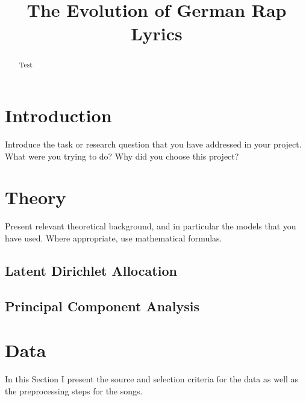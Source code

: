\documentclass[conference]{IEEEtran}
\begin{document}
\title{The Evolution of German Rap Lyrics}


\author{
}

\maketitle

\begin{abstract}
Test
\end{abstract}

\section{Introduction}
Introduce the task or research question that you have addressed in
your project. What were you trying to do? Why did you choose this project?

\section{Theory}
Present relevant theoretical background, and in particular the models that
you have used. Where appropriate, use mathematical formulas.
\subsection{Latent Dirichlet Allocation}
\subsection{Principal Component Analysis}

\section{Data}
In this Section I present the source and selection criteria for the data as well as the preprocessing steps for the songs.
\end{document}
